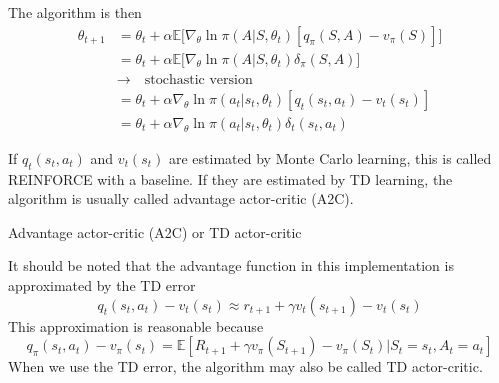 \documentclass[10pt]{elegantbook}
\begin{document}
The algorithm is then
\begin{equation}
    \begin{aligned}
        \theta_{t+1} &= \theta_t + \alpha \mathbb E \big [ \nabla_{\theta} \ln \pi(A|S,\theta_{t}) [q_{\pi}(S,A) - v_{\pi}(S)] \big ] \\
        &= \theta_t + \alpha \mathbb E \big [ \nabla_{\theta} \ln \pi(A|S,\theta_{t}) \delta_{\pi}(S,A) \big ] \\
        &\rightarrow \quad \text{stochastic version} \\
        &= \theta_{t}+\alpha\nabla_{\theta}\ln\pi(a_{t}|s_{t},\theta_{t})[q_{t}(s_{t},a_{t})-v_{t}(s_{t})] \\
        &= \theta_{t}+\alpha\nabla_{\theta}\ln\pi(a_{t}|s_{t},\theta_{t})\delta_{t}(s_{t},a_{t})
    \end{aligned}
\end{equation}

If $q_t(s_t, a_t)$ and $v_t(s_t)$ are estimated by Monte Carlo learning, this is
called REINFORCE with a baseline. If they are estimated by TD learning,
the algorithm is usually called advantage actor-critic (A2C).

\vspace{\baselineskip}

\begin{algorithm}[H]
\caption{Advantage actor-critic (A2C) or TD actor-critic}

\end{algorithm}

\vspace{\baselineskip}

It should be noted that the advantage function in this
implementation is approximated by the TD error
\[
    q_{t}(s_{t},a_{t})-v_{t}(s_{t})\approx r_{t+1}+\gamma v_{t}(s_{t+1})-v_{t}(s_{t})
\]
This approximation is reasonable because
\[
    q_{\pi}(s_{t},a_{t})-v_{\pi}(s_{t})=\mathbb{E}\left[R_{t+1}+\gamma v_{\pi}(S_{t+1})-v_{\pi}(S_{t})\vert S_{t}=s_{t},A_{t}=a_{t}\right]
\]
When we use the TD error, the algorithm may also be called TD actor-critic.
\end{document}
